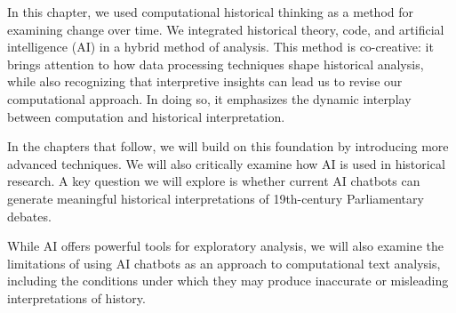 \documentclass[
]{article}
\begin{document}
In this chapter, we used computational historical thinking as a method
for examining change over time. We integrated historical theory, code,
and artificial intelligence (AI) in a hybrid method of analysis. This
method is co-creative: it brings attention to how data processing
techniques shape historical analysis, while also recognizing that
interpretive insights can lead us to revise our computational approach.
In doing so, it emphasizes the dynamic interplay between computation and
historical interpretation.

In the chapters that follow, we will build on this foundation by
introducing more advanced techniques. We will also critically examine
how AI is used in historical research. A key question we will explore is
whether current AI chatbots can generate meaningful historical
interpretations of 19th-century Parliamentary debates.

While AI offers powerful tools for exploratory analysis, we will also
examine the limitations of using AI chatbots as an approach to
computational text analysis, including the conditions under which they
may produce inaccurate or misleading interpretations of history.
\end{document}
